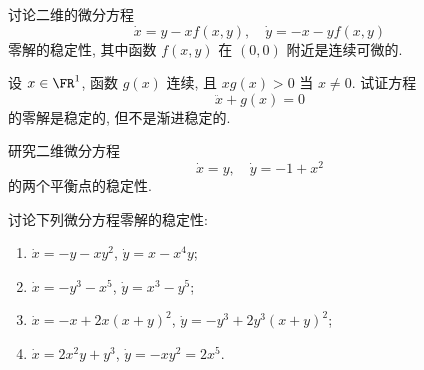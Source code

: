 \begin{exercise}
  讨论二维的微分方程
  \[\dot{x} = y-xf(x,y),\quad \dot{y} = -x-yf(x,y)\]
  零解的稳定性, 其中函数 $f(x,y)$ 在 $(0,0)$ 附近是连续可微的.
\end{exercise}



\begin{exercise}
  设 $x\in\FR^1$, 函数 $g(x)$ 连续, 且 $xg(x)>0$ 当 $x\neq 0$. 试证方程
  \[\ddot{x}+g(x) = 0\]
  的零解是稳定的, 但不是渐进稳定的.
\end{exercise}



\begin{exercise}
  研究二维微分方程
  \[\dot{x} = y,\quad \dot{y} = -1+x^2\]
  的两个平衡点的稳定性.
\end{exercise}



\begin{exercise}
  讨论下列微分方程零解的稳定性:
  \begin{enumerate}[(1)]
    \item $\dot{x} = -y-xy^2$, $\dot{y} = x-x^4y$;
    \item $\dot{x} = -y^3-x^5$, $\dot{y} = x^3-y^5$;
    \item $\dot{x} = -x+2x(x+y)^2$, $\dot{y} = -y^3+2y^3(x+y)^2$;
    \item $\dot{x} = 2x^2y+y^3$, $\dot{y} = -xy^2=2x^5$.
  \end{enumerate}
\end{exercise}